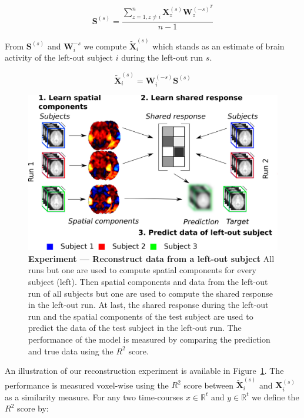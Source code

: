 \begin{equation*}
	\mathbf{S}^{(s)} = \frac{\sum_{z=1, z\neq i}^n \mathbf{X}^{(s)}_z\mathbf{W}^{(-s)^T}_z}{n - 1}
\end{equation*}

From $\mathbf{S}^{(s)}$ and $\mathbf{W}_i^{-s}$ we compute $\widetilde{\mathbf{X}}^{(s)}_i$ which stands as an estimate of brain activity of the left-out subject $i$ during the left-out run $s$.

\begin{equation*}
	\widetilde{\mathbf{X}}_i^{(s)} = \mathbf{W}^{(-s)}_i \mathbf{S}^{(s)}
\end{equation*}


\begin{figure}
\centering
\includegraphics[scale=0.24]{figures/srm/conceptual_figure41.png}
\caption{\textbf{Experiment — Reconstruct data from a left-out subject} All runs but one are used to compute spatial components for every subject (left).
  Then spatial components and data from the left-out run of all subjects but one are used to compute the shared response in the left-out run.
  At last, the shared response during the left-out run and  the spatial components of the test subject are used to predict the data of the test subject in the left-out run.
  The performance of the model is measured by comparing the prediction and true data using the $R^2$ score.}
\label{fig:experiment_reconstruction}
\end{figure}


An illustration of our reconstruction experiment is available in Figure~\ref{fig:experiment_reconstruction}.
%
The performance is measured voxel-wise using the $R^2$ score between $\widetilde{\mathbf{X}}_i^{(s)}$ and $\mathbf{X}_i^{(s)}$ as a similarity measure.
For any two time-courses $x \in \mathbb{R}^t$ and $y \in \mathbb{R}^t$ we define the $R^2$ score by:

